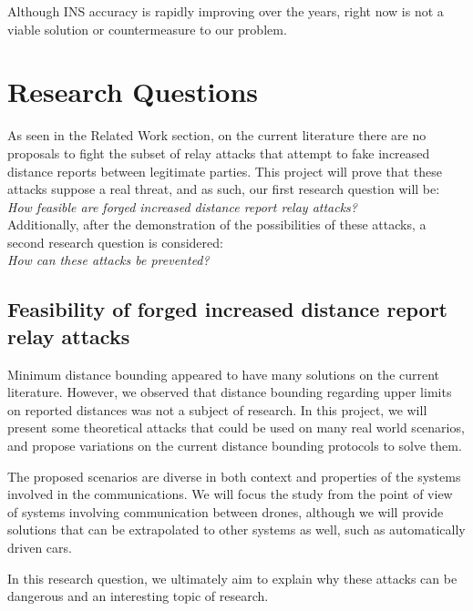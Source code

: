\documentclass{article}
\begin{document}
Although INS accuracy is rapidly improving over the years, right now is not a viable solution or countermeasure to our problem.







\section{Research Questions}
\label{sec:researchquestions}

As seen in the Related Work section, on the current literature there are no proposals to fight the subset of relay attacks that attempt to fake increased distance reports between legitimate parties. This project will prove that these attacks suppose a real threat, and as such, our first research question will be:\\

\emph{How feasible are forged increased distance report relay attacks?}\\

Additionally, after the demonstration of the possibilities of these attacks, a second research question is considered:\\

\emph{How can these attacks be prevented?}

\subsection{Feasibility of forged increased distance report relay attacks}

Minimum distance bounding appeared to have many solutions on the current literature. However, we observed that distance bounding regarding upper limits on reported distances was not a subject of research. In this project, we will present some theoretical attacks that could be used on many real world scenarios, and propose variations on the current distance bounding protocols to solve them.

The proposed scenarios are diverse in both context and properties of the systems involved in the communications. We will focus the study from the point of view of systems involving communication between drones, although we will provide solutions that can be extrapolated to other systems as well, such as automatically driven cars.

In this research question, we ultimately aim to explain why these attacks can be dangerous and an interesting topic of research.
\end{document}

